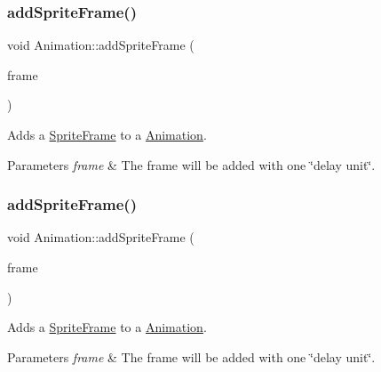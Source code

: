 \subsubsection{\texorpdfstring{add\+Sprite\+Frame()}{addSpriteFrame()}\hspace{0.1cm}{\footnotesize\ttfamily [1/2]}}
{\footnotesize\ttfamily void Animation\+::add\+Sprite\+Frame (\begin{DoxyParamCaption}\item[{\hyperlink{classSpriteFrame}{Sprite\+Frame} $\ast$}]{frame }\end{DoxyParamCaption})}

Adds a \hyperlink{classSpriteFrame}{Sprite\+Frame} to a \hyperlink{classAnimation}{Animation}.


\begin{DoxyParams}{Parameters}
{\em frame} & The frame will be added with one \char`\"{}delay unit\char`\"{}. \\
\hline
\end{DoxyParams}
\mbox{\label{classAnimation_a560fb49ea8765f6a13ebb272effbc7cb}} 
\subsubsection{\texorpdfstring{add\+Sprite\+Frame()}{addSpriteFrame()}\hspace{0.1cm}{\footnotesize\ttfamily [2/2]}}
{\footnotesize\ttfamily void Animation\+::add\+Sprite\+Frame (\begin{DoxyParamCaption}\item[{\hyperlink{classSpriteFrame}{Sprite\+Frame} $\ast$}]{frame }\end{DoxyParamCaption})}

Adds a \hyperlink{classSpriteFrame}{Sprite\+Frame} to a \hyperlink{classAnimation}{Animation}.


\begin{DoxyParams}{Parameters}
{\em frame} & The frame will be added with one \char`\"{}delay unit\char`\"{}. \\
\hline
\end{DoxyParams}
\mbox{\label{classAnimation_ab57ae7ddaf2adca5d944d931e892d203}} 
